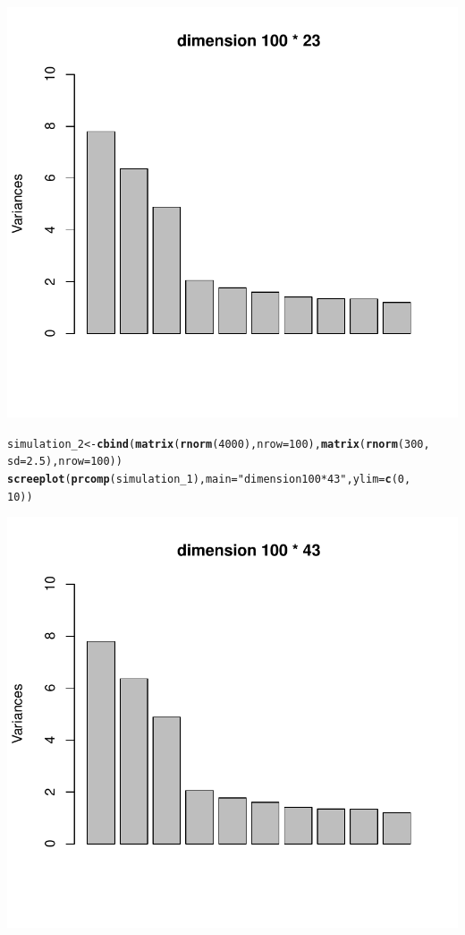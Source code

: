 \documentclass{article}\usepackage[]{graphicx}\usepackage[]{color}
\makeatletter
\def\maxwidth{ %
  \ifdim\Gin@nat@width>\linewidth
    \linewidth
  \else
    \Gin@nat@width
  \fi
}
\newcommand{\hlnum}[1]{\textcolor[rgb]{0.686,0.059,0.569}{#1}}%
\newcommand{\hlstr}[1]{\textcolor[rgb]{0.192,0.494,0.8}{#1}}%
\newcommand{\hlstd}[1]{\textcolor[rgb]{0.345,0.345,0.345}{#1}}%
\newcommand{\hlkwb}[1]{\textcolor[rgb]{0.69,0.353,0.396}{#1}}%
\newcommand{\hlkwc}[1]{\textcolor[rgb]{0.333,0.667,0.333}{#1}}%
\newcommand{\hlkwd}[1]{\textcolor[rgb]{0.737,0.353,0.396}{\textbf{#1}}}%
\newenvironment{kframe}{%
 \def\at@end@of@kframe{}%
 \ifinner\ifhmode%
  \def\at@end@of@kframe{\end{minipage}}%
  \begin{minipage}{\columnwidth}%
 \fi\fi%
 \def\FrameCommand##1{\hskip\@totalleftmargin \hskip-\fboxsep
 \colorbox{shadecolor}{##1}\hskip-\fboxsep
     \hskip-\linewidth \hskip-\@totalleftmargin \hskip\columnwidth}%
 \MakeFramed {\advance\hsize-\width
   \@totalleftmargin\z@ \linewidth\hsize
   \@setminipage}}%
 {\par\unskip\endMakeFramed%
 \at@end@of@kframe}
\newenvironment{knitrout}{}{} %
\makeatother
\begin{document}
\begin{knitrout}
{\centering \includegraphics[width=\maxwidth]{figure/minimal-Problem_52} 

}


\begin{kframe}\begin{alltt}
\hlstd{simulation_2} \hlkwb{<-} \hlkwd{cbind}\hlstd{(}\hlkwd{matrix}\hlstd{(}\hlkwd{rnorm}\hlstd{(}\hlnum{4000}\hlstd{),} \hlkwc{nrow} \hlstd{=} \hlnum{100}\hlstd{),} \hlkwd{matrix}\hlstd{(}\hlkwd{rnorm}\hlstd{(}\hlnum{300}\hlstd{,}
    \hlkwc{sd} \hlstd{=} \hlnum{2.5}\hlstd{),} \hlkwc{nrow} \hlstd{=} \hlnum{100}\hlstd{))}
\hlkwd{screeplot}\hlstd{(}\hlkwd{prcomp}\hlstd{(simulation_1),} \hlkwc{main} \hlstd{=} \hlstr{"dimension 100 * 43"}\hlstd{,} \hlkwc{ylim} \hlstd{=} \hlkwd{c}\hlstd{(}\hlnum{0}\hlstd{,}
    \hlnum{10}\hlstd{))}
\end{alltt}
\end{kframe}

{\centering \includegraphics[width=\maxwidth]{figure/minimal-Problem_53} 

}
\end{knitrout}
\end{document}
